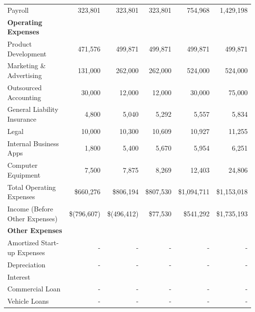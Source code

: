 \documentclass[11pt,openany]{book}
\begin{document}
\begin{landscape}
\begin{center}
\begin{longtable}[]{@{}lrrrrr@{}}
      \hspace{3mm} Payroll & 323,801 & 323,801 & 323,801 & 754,968 & 1,429,198 \\
      \textbf{Operating Expenses} & & & & & \\
      \midrule
      \hspace{3mm} Product Development & 471,576 & 499,871 & 499,871 & 499,871 & 499,871 \\
      \hspace{3mm} Marketing \& Advertising & 131,000 & 262,000 & 262,000 & 524,000 & 524,000 \\
      \hspace{3mm} Outsourced Accounting & 30,000 & 12,000 & 12,000 & 30,000 & 75,000 \\
      \hspace{3mm} General Liability Insurance & 4,800 & 5,040 & 5,292 & 5,557 & 5,834 \\
      \hspace{3mm} Legal & 10,000 & 10,300 & 10,609 & 10,927 & 11,255 \\
      \hspace{3mm} Internal Business Apps & 1,800 & 5,400 & 5,670 & 5,954 & 6,251 \\
      \hspace{3mm} Computer Equipment & 7,500 & 7,875 & 8,269 & 12,403 & 24,806 \\
      \hspace{3mm} Total Operating Expenses & \$660,276 & \$806,194 & \$807,530 & \$1,094,711 & \$1,153,018 \\
      \hspace{3mm} Income (Before Other Expenses) & \$(796,607) & \$(496,412) & \$77,530 & \$541,292 & \$1,735,193 \\
      \textbf{Other Expenses} & & & & & \\
      \midrule
      \hspace{3mm} Amortized Start-up Expenses & - & - & - & - & - \\
      \hspace{3mm} Depreciation & - & - & - & - & - \\
      \hspace{3mm} Interest & & & & & \\
      \hspace{3mm} Commercial Loan & - & - & - & - & - \\
      \hspace{3mm} Vehicle Loans & - & - & - & - & - \\

\end{longtable}
\end{center}
\end{landscape}
\end{document}
